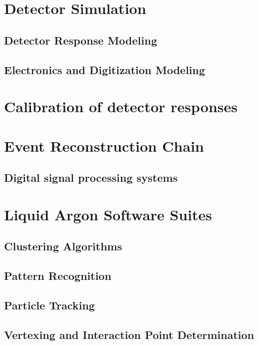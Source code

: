 \section{Detector Simulation}
\subsection{Detector Response Modeling}
\subsection{Electronics and Digitization Modeling}

\section{Calibration of detector responses}

\section{Event Reconstruction Chain}
\subsection{Digital signal processing systems}

\section{Liquid Argon Software Suites}

\subsection{Clustering Algorithms}
\subsection{Pattern Recognition}
\subsection{Particle Tracking}
\subsection{Vertexing and Interaction Point Determination}

